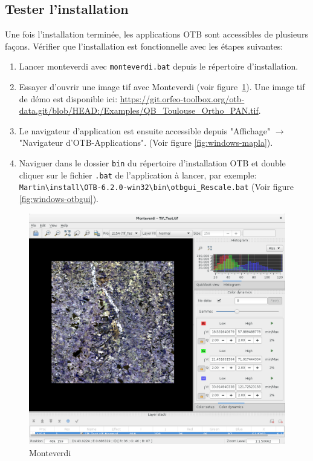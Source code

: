 \documentclass[10pt,a4paper]{article}
\begin{document}
\subsection{Tester l'installation}
Une fois l'installation terminée, les applications OTB sont accessibles de
plusieurs façons. Vérifier que l'installation est fonctionnelle avec les étapes
suivantes:
\begin{enumerate}

\item Lancer monteverdi avec \texttt{monteverdi.bat} depuis le répertoire
d'installation.

\item Essayer d'ouvrir une image tif avec Monteverdi (voir
figure~\ref{fig:monteverdi}). Une image tif de démo est
disponible ici: \url{https://git.orfeo-toolbox.org/otb-data.git/blob/HEAD:/Examples/QB\_Toulouse\_Ortho\_PAN.tif}.

\item Le navigateur d'application est ensuite accessible depuis "Affichage"
$\rightarrow$ "Navigateur d'OTB-Applications".
(Voir figure \ref{fig:windows-mapla}).

\item Naviguer dans le dossier \texttt{bin} du répertoire d'installation OTB et double cliquer sur le
fichier \texttt{.bat} de l'application à lancer, par exemple:\\
\texttt{Martin{\textbackslash}install{\textbackslash}OTB-6.2.0-win32{\textbackslash}bin{\textbackslash}otbgui\_Rescale.bat}
(Voir figure \ref{fig:windows-otbgui}).

\end{enumerate}

\begin{figure}[h]
  \center
  \includegraphics[width=1\textwidth]{Art/monteverdi-tif.png}
  \caption[]{Monteverdi}
  \label{fig:monteverdi}
\end{figure}
\end{document}
